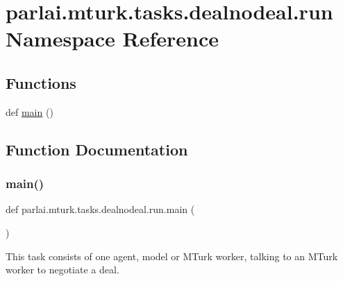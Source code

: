 \hypertarget{namespaceparlai_1_1mturk_1_1tasks_1_1dealnodeal_1_1run}{}\section{parlai.\+mturk.\+tasks.\+dealnodeal.\+run Namespace Reference}
\label{namespaceparlai_1_1mturk_1_1tasks_1_1dealnodeal_1_1run}
\subsection*{Functions}
\begin{DoxyCompactItemize}
\item 
def \hyperlink{namespaceparlai_1_1mturk_1_1tasks_1_1dealnodeal_1_1run_aafb6d1c8bf3b37bc874ee8d8dcbecce8}{main} ()
\end{DoxyCompactItemize}


\subsection{Function Documentation}
\mbox{\label{namespaceparlai_1_1mturk_1_1tasks_1_1dealnodeal_1_1run_aafb6d1c8bf3b37bc874ee8d8dcbecce8}} 
\subsubsection{\texorpdfstring{main()}{main()}}
{\footnotesize\ttfamily def parlai.\+mturk.\+tasks.\+dealnodeal.\+run.\+main (\begin{DoxyParamCaption}{ }\end{DoxyParamCaption})}

\begin{DoxyVerb}This task consists of one agent, model or MTurk worker, talking to an MTurk worker
to negotiate a deal.
\end{DoxyVerb}
 